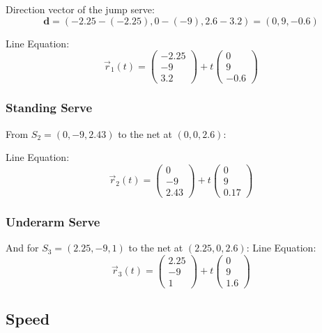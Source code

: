 \documentclass{article}
\begin{document}
		Direction vector of the jump serve:
		\[
			\mathbf{d} = (-2.25 - (-2.25), 0 - (-9), 2.6 - 3.2) = (0, 9, -0.6)
		\]

		Line Equation:
		\[\vec{r}_1(t) = 
			\begin{pmatrix} -2.25 \\ -9 \\ 3.2 \end{pmatrix} 
			+ t \begin{pmatrix} 0 \\ 9 \\ -0.6 \end{pmatrix}\]


			\subsubsection*{Standing Serve}

			From \(S_2 = (0, -9, 2.43)\) to the net at \((0, 0, 2.6)\):\vspace{15pt}

			Line Equation:
			\[\vec{r}_2(t) = 
				\begin{pmatrix} 0 \\ -9 \\ 2.43 \end{pmatrix} 
				+ t \begin{pmatrix} 0 \\ 9 \\ 0.17 \end{pmatrix}\]

				\subsubsection*{Underarm Serve}

				And for \(S_3 = (2.25, -9, 1)\) to the net at \((2.25, 0, 2.6)\):
				\vspace{30pt}
				Line Equation:
				\[\vec{r}_3(t) = 
					\begin{pmatrix} 2.25 \\ -9 \\ 1 \end{pmatrix} 
					+ t \begin{pmatrix} 0 \\ 9 \\ 1.6 \end{pmatrix}\]


					\subsection*{Speed}
\end{document}
